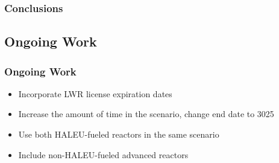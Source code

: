 \begin{frame}
    \frametitle{Conclusions}

\end{frame}

\subsection{Ongoing Work}
\begin{frame}
    \frametitle{Ongoing Work}
    \begin{itemize}
        \item Incorporate \gls{LWR} license expiration dates
        \item Increase the amount of time in the scenario, change end date to 3025
        \item Use both \gls{HALEU}-fueled reactors in the same scenario
        \item Include non-\gls{HALEU}-fueled advanced reactors
    \end{itemize}

    

\end{frame}
